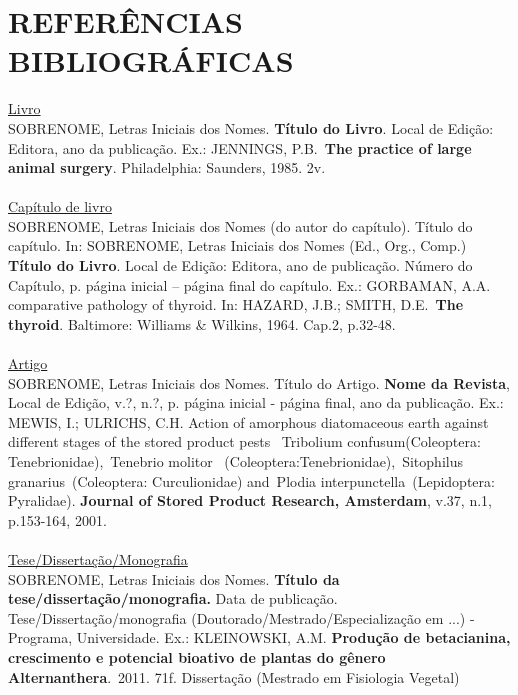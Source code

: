 \documentclass[12pt, a4paper]{article}
\begin{document}
	\section{REFERÊNCIAS BIBLIOGRÁFICAS}
	\noindent\underline{Livro}
	\\
	SOBRENOME, Letras Iniciais dos Nomes. \textbf{Título do Livro}. Local de 
	Edição: Editora, ano da publicação. Ex.: JENNINGS, P.B. \textbf{The 
	practice of large animal surgery}. Philadelphia: Saunders, 1985. 2v.
	\\\\
	\underline{Capítulo de livro}
	\\
	SOBRENOME, Letras Iniciais dos Nomes (do autor do capítulo). Título do 
	capítulo. In: SOBRENOME, Letras Iniciais dos Nomes (Ed., Org., Comp.) 	
	\textbf{Título do Livro}. Local de Edição: Editora, ano de publicação.	
	Número do Capítulo, p. página inicial – página final do capítulo.	Ex.: 
	GORBAMAN, A.A. comparative pathology of thyroid. In: HAZARD, J.B.; SMITH, 
	D.E. \textbf{The thyroid}. Baltimore: Williams \& Wilkins, 1964. Cap.2, 
	p.32-48.
	\\\\
	\underline{Artigo}
	\\
	SOBRENOME, Letras Iniciais dos Nomes. Título do Artigo. \textbf{Nome da 	
	Revista}, 	Local de Edição, v.?, n.?, p. página inicial - página final, 
	ano da 	publicação.	Ex.: MEWIS, I.; ULRICHS, C.H. Action of amorphous 
	diatomaceous earth 	against different stages of the stored product pests 
	Tribolium	confusum(Coleoptera: Tenebrionidae), Tenebrio molitor 	
	(Coleoptera:Tenebrionidae), Sitophilus granarius (Coleoptera: 	
	Curculionidae) and Plodia interpunctella (Lepidoptera: Pyralidae).	
	\textbf{Journal of Stored Product Research, Amsterdam}, v.37, n.1, 
	p.153-164, 2001. 
	\\\\
	\underline{Tese/Dissertação/Monografia}
	\\
	SOBRENOME, Letras Iniciais dos Nomes. \textbf{Título da	
	tese/dissertação/monografia.} Data de publicação. 	
	Tese/Dissertação/monografia (Doutorado/Mestrado/Especialização em ...) - 	
	Programa, Universidade.	Ex.: KLEINOWSKI, A.M. \textbf{Produção de 
	betacianina, crescimento e 	potencial 	bioativo de plantas do gênero 
	Alternanthera}. 2011. 71f. Dissertação 	(Mestrado em Fisiologia Vegetal) 
\end{document}
